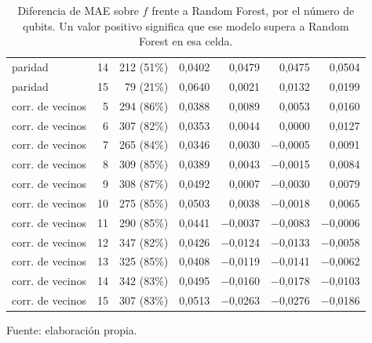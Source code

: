 \begin{table}[htbp]
{\begin{tabular}{@{}lrrrrrr@{}}
        paridad & 14 & 212 (51\%) & 0,0402 & 0,0479 & 0,0475 & 0,0504 \\
        paridad & 15 & 79 (21\%) & 0,0640 & 0,0021 & 0,0132 & 0,0199 \\
        corr. de vecinos & 5 & 294 (86\%) & 0,0388 & 0,0089 & 0,0053 & 0,0160 \\
        corr. de vecinos & 6 & 307 (82\%) & 0,0353 & 0,0044 & 0,0000 & 0,0127 \\
        corr. de vecinos & 7 & 265 (84\%) & 0,0346 & 0,0030 & $-$0,0005 & 0,0091 \\
        corr. de vecinos & 8 & 309 (85\%) & 0,0389 & 0,0043 & $-$0,0015 & 0,0084 \\
        corr. de vecinos & 9 & 308 (87\%) & 0,0492 & 0,0007 & $-$0,0030 & 0,0079 \\
        corr. de vecinos & 10 & 275 (85\%) & 0,0503 & 0,0038 & $-$0,0018 & 0,0065 \\
        corr. de vecinos & 11 & 290 (85\%) & 0,0441 & $-$0,0037 & $-$0,0083 & $-$0,0006 \\
        corr. de vecinos & 12 & 347 (82\%) & 0,0426 & $-$0,0124 & $-$0,0133 & $-$0,0058 \\
        corr. de vecinos & 13 & 325 (85\%) & 0,0408 & $-$0,0119 & $-$0,0141 & $-$0,0062 \\
        corr. de vecinos & 14 & 342 (83\%) & 0,0495 & $-$0,0160 & $-$0,0178 & $-$0,0103 \\
        corr. de vecinos & 15 & 307 (83\%) & 0,0513 & $-$0,0263 & $-$0,0276 & $-$0,0186 \\
        \bottomrule
    \end{tabular}}

    \caption{Diferencia de MAE sobre $f$ frente a Random Forest, por el número de qubits. Un valor positivo significa que ese modelo supera a Random Forest en esa celda.}
    \label{tab:v3_tamano_mae_dif}

    {\footnotesize Fuente: elaboración propia.}
\end{table}
